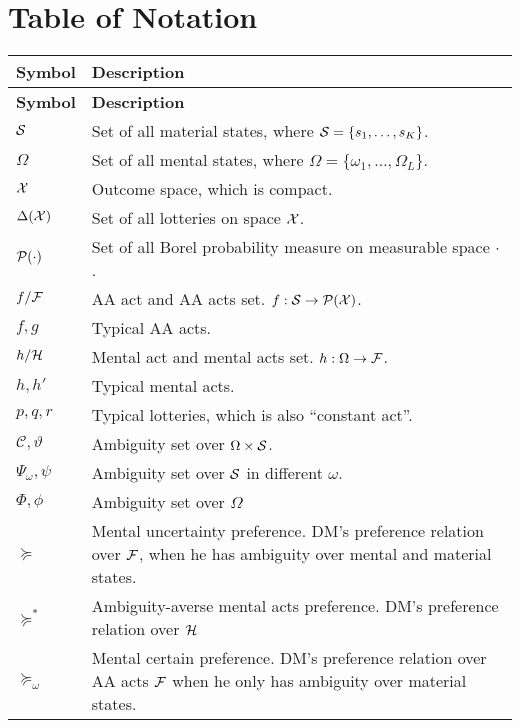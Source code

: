 \documentclass[11pt,oneside]{article}
\theoremstyle{plain}
\theoremstyle{plain}
\theoremstyle{plain}
\theoremstyle{plain}
\theoremstyle{plain}
\theoremstyle{definition}
\theoremstyle{definition}
\theoremstyle{remark}
\theoremstyle{plain}
\newcommand{\F}{{\cal F}}
\newcommand{\calpx}{{\cal P}({\cal X})}
\newcommand{\mcs}{{\cal S}}
\newcommand{\mcx}{{\cal X}}
\newcommand{\pf}{\succeq}
\newcommand{\pfs}{\succeq^*}
\begin{document}




\newpage
\appendix

\section{Table of Notation}

\begin{longtable}[c]{>{\raggedright}p{} p{}}
    \hline
    \textbf{Symbol} & \textbf{Description} \\
    \hline
    \endfirsthead
    
    \hline
    \textbf{Symbol} & \textbf{Description} \\
    \hline
    \endhead
    
    \hline
    \endfoot
    
    \hline
    \endlastfoot
    
    $\mcs$ & Set of all material states, where $\mcs=\{s_1,\ldots,s_{K}\}$. \\
    $\Omega$ & Set of all mental states, where $\Omega=\{\omega_1,\ldots,\Omega_{L}\}$. \\
    $\mcx$ & Outcome space, which is compact.\\
    $\Delta(\mcx)$ & Set of all lotteries on space $\mcx$.\\
    ${\cal P}(\cdot)$ & Set of all Borel probability measure on measurable space $\cdot$.\\
    $f/\F$ & AA act and AA acts set. $f:\mcs \to \calpx$.\\ 
    $f,g$ & Typical AA acts.\\
    $h/{\cal H}$ & Mental act and mental acts set. $h:\Omega\to \F$.\\
    $h,h'$ & Typical mental acts.\\
    $p,q,r$ & Typical lotteries, which is also ``constant act''.\\
    $\mathcal{C},\vartheta$ & Ambiguity set over $\Omega \times \mcs$.\\
    $\Psi_\omega,\psi$ & Ambiguity set over $\mcs$ in different $\omega$.\\
    $\Phi,\phi$ & Ambiguity set over $\Omega$ \\
    $\pf$ & Mental uncertainty preference. DM's preference relation over $\F$, when he has ambiguity over mental and material states.\\
    $\pfs$ & Ambiguity-averse mental acts preference. DM's preference relation over ${\cal H}$\\
    $\pf_\omega$ & Mental certain preference. DM's preference relation over AA acts $\F$ when he only has ambiguity over material states.\\

\end{longtable}
\end{document}
